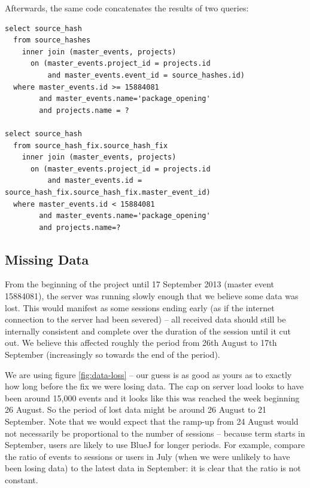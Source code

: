 \documentclass{report}
\begin{document}
Afterwards, the same code concatenates the results of two queries:

\begin{lstlisting}
select source_hash
  from source_hashes
    inner join (master_events, projects)
      on (master_events.project_id = projects.id
          and master_events.event_id = source_hashes.id)
  where master_events.id >= 15884081
        and master_events.name='package_opening'
        and projects.name = ?

select source_hash
  from source_hash_fix.source_hash_fix
    inner join (master_events, projects)
      on (master_events.project_id = projects.id
          and master_events.id = source_hash_fix.source_hash_fix.master_event_id)
  where master_events.id < 15884081
        and master_events.name='package_opening'
        and projects.name=?
\end{lstlisting}

\lstset{columns=flexible,language=SQL,basicstyle=\ttfamily}
\subsection{Missing Data}

From the beginning of the project until 17 September 2013 (master event 15884081), the server was running slowly enough that we believe some data was lost.  This would manifest as some sessions ending early (as if the internet connection to the server had been severed) -- all received data should still be internally consistent and complete over the duration of the session until it cut out.  We believe this affected roughly the period from 26th August to 17th September (increasingly so towards the end of the period).

We are using figure \ref{fig:data-loss} -- our guess is as good as yours as to exactly how long before the fix we were losing data.  The cap on server load looks to have been around 15,000 events and it looks like this was reached the week beginning 26 August.  So the period of lost data might be around 26 August to 21 September.  Note that we would expect that the ramp-up from 24 August would not necessarily be proportional to the number of sessions -- because term starts in September, users are likely to use BlueJ for longer periods.  For example, compare the ratio of events to sessions or users in July (when we were unlikely to have been losing data) to the latest data in September: it is clear that the ratio is not constant.
\end{document}
